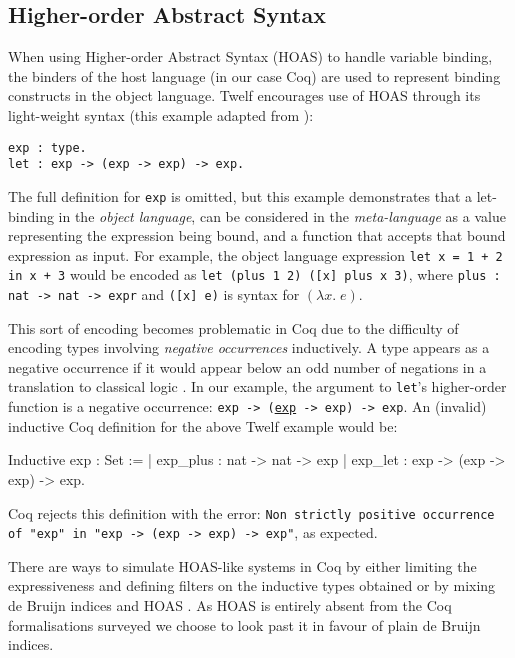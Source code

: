 \documentclass[]{unswthesis}
\let\c\texttt
\let\i\textit
\begin{document}
\subsection{Higher-order Abstract Syntax}

When using Higher-order Abstract Syntax (HOAS) to handle variable binding, the binders of the host language (in our case Coq) are used to represent binding constructs in the object language. Twelf encourages use of HOAS through its light-weight syntax (this example adapted from \cite{twelf08}):

\begin{verbatim}
exp : type.
let : exp -> (exp -> exp) -> exp.
\end{verbatim}

The full definition for \c{exp} is omitted, but this example demonstrates that a let-binding in the \i{object language}, can be considered in the \i{meta-language} as a value representing the expression being bound, and a function that accepts that bound expression as input. For example, the object language expression \c{let x = 1 + 2 in x + 3} would be encoded as \c{let (plus 1 2) ([x] plus x 3)}, where \c{plus : nat -> nat -> expr} and \c{([x] e)} is syntax for $(\lambda x. \; e)$.

This sort of encoding becomes problematic in Coq due to the difficulty of encoding types involving \i{negative occurrences} inductively. A type appears as a negative occurrence if it would appear below an odd number of negations in a translation to classical logic \cite{tapl}. In our example, the argument to \c{let}'s higher-order function is a negative occurrence: \c{exp -> (\underline{exp} -> exp) -> exp}. An (invalid) inductive Coq definition for the above Twelf example would be:
\begin{coqcode}
Inductive exp : Set :=
  | exp_plus : nat -> nat -> exp
  | exp_let : exp -> (exp -> exp) -> exp.
\end{coqcode}

Coq rejects this definition with the error: \c{Non strictly positive occurrence of "exp" in
 "exp -> (exp -> exp) -> exp"}, as expected.

There are ways to simulate HOAS-like systems in Coq by either limiting the expressiveness and defining filters on the inductive types obtained \cite{despeyroux95} or by mixing de Bruijn indices and HOAS \cite{capretta07}. As HOAS is entirely absent from the Coq formalisations surveyed we choose to look past it in favour of plain de Bruijn indices.
\end{document}
